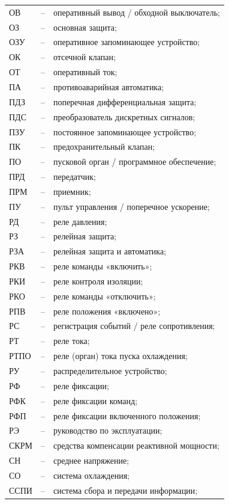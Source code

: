 \begin{longtable}{>{\raggedright\arraybackslash}m{2cm}>{\raggedright\arraybackslash}m{0.5cm}>{\raggedright\arraybackslash}m{20cm}}
ОВ & -- & оперативный вывод / обходной выключатель; \\
ОЗ & -- & основная защита; \\
ОЗУ & -- & оперативное запоминающее устройство; \\
ОК & -- & отсечной клапан; \\
ОТ & -- & оперативный ток; \\
ПА & -- & противоаварийная автоматика; \\
ПДЗ & -- & поперечная дифференциальная защита; \\
ПДС & -- & преобразователь дискретных сигналов; \\
ПЗУ & -- & постоянное запоминающее устройство; \\
ПК & -- & предохранительный клапан; \\
ПО & -- & пусковой орган / программное обеспечение; \\
ПРД & -- & передатчик; \\
ПРМ & -- & приемник; \\
ПУ & -- & пульт управления / поперечное ускорение; \\
РД & -- & реле давления; \\
РЗ & -- & релейная защита; \\
РЗА & -- & релейная защита и автоматика; \\
РКВ & -- & реле команды «включить»; \\
РКИ & -- & реле контроля изоляции; \\
РКО & -- & реле команды «отключить»; \\
РПВ & -- & реле положения «включено»; \\
РС & -- & регистрация событий / реле сопротивления; \\
РТ & -- & реле тока; \\
РТПО & -- & реле (орган) тока пуска охлаждения; \\
РУ & -- & распределительное устройство; \\
РФ & -- & реле фиксации; \\
РФК & -- & реле фиксации команд; \\
РФП & -- & реле фиксации включенного положения; \\
РЭ & -- & руководство по эксплуатации; \\
СКРМ & -- & средства компенсации реактивной мощности; \\
СН & -- & среднее напряжение; \\
СО & -- & система охлаждения; \\
ССПИ & -- & система сбора и передачи информации; \\

\end{longtable}
